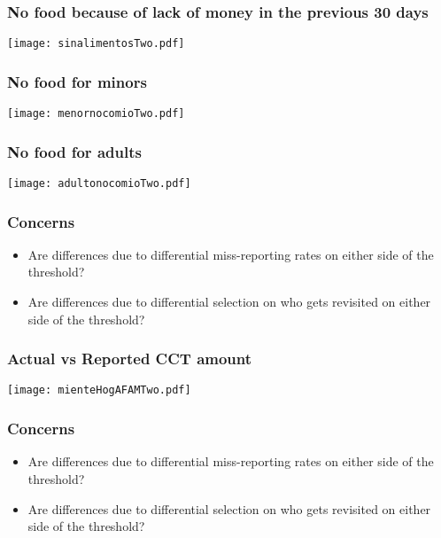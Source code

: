 \documentclass{beamer}
\begin{document}
\begin{frame}
\frametitle{No food because of lack of money in the previous 30 days}
\begin{center}
	\texttt{[image: sinalimentosTwo.pdf]}
	\label{sinalimentosTwo}
\end{center}
\end{frame}

\begin{frame}
\frametitle{No food for minors}
\begin{center}
\texttt{[image: menornocomioTwo.pdf]}
\label{menornocomioTwo}
\end{center}
\end{frame}

\begin{frame}
\frametitle{No food for adults}
\begin{center}
	\texttt{[image: adultonocomioTwo.pdf]}
	\label{adultonocomioTwo}
\end{center}
\end{frame}

\begin{frame}
\frametitle{Concerns}
\begin{itemize}
	\item Are differences due to differential miss-reporting rates on either side of the threshold?
	\item {\color{gray}Are differences due to differential selection on who gets revisited on either side of the threshold?}
\end{itemize}
\end{frame}

\begin{frame}
\frametitle{Actual vs Reported CCT amount}
\begin{center}
	\texttt{[image: mienteHogAFAMTwo.pdf]}
	\label{mienteHogAFAMTwo}
\end{center}
\end{frame}

\begin{frame}
\frametitle{Concerns}
\begin{itemize}
	\item {\color{gray}Are differences due to differential miss-reporting rates on either side of the threshold?}
	\item Are differences due to differential selection on who gets revisited on either side of the threshold?
\end{itemize}
\end{frame}
\end{document}
